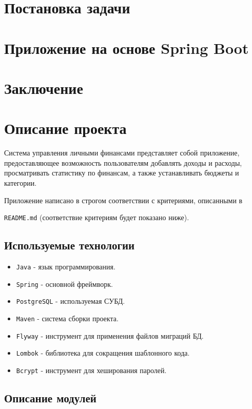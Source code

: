 \documentclass[a4paper, 14pt]{article}
\begin{document}
\large
\tableofcontents

\newpage
\section{Постановка задачи}

\newpage
\section{Приложение на основе Spring Boot}

\newpage
\section{Заключение}

\iffalse
\section{Описание проекта}

Система управления личными финансами представляет собой приложение, предоставляющее возможность пользователям добавлять доходы и расходы, просматривать статистику по финансам, а также устанавливать бюджеты и категории.

Приложение написано в строгом соответствии с критериями, описанными в

\texttt{README.md} (соответствие критериям будет показано ниже).

\subsection{Используемые технологии}

\begin{itemize}
	\item \texttt{Java} - язык программирования.
	\item \texttt{Spring} - основной фреймворк.
	\item \texttt{PostgreSQL} - используемая СУБД.
	\item \texttt{Maven} - система сборки проекта.
	\item \texttt{Flyway} - инструмент для применения файлов миграций БД.
	\item \texttt{Lombok} - библиотека для сокращения шаблонного кода.
	\item \texttt{Bcrypt} - инструмент для хеширования паролей.
\end{itemize}

\subsection{Описание модулей}
\end{document}
